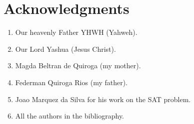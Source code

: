 \documentclass{easychair}
\begin{document}
\section{Acknowledgments}
\label{sect:acknowledgments}

\begin{enumerate}
\item
Our heavenly Father YHWH (Yahweh).

\item
Our Lord Yashua (Jesus Christ).

\item
Magda Beltran de Quiroga (my mother).

\item
Federman Quiroga Rios (my father).

\item
Joao Marquez da Silva for his work on the SAT problem.

\item
All the authors in the bibliography.

\end{enumerate}

\label{sect:bib}



\end{document}
